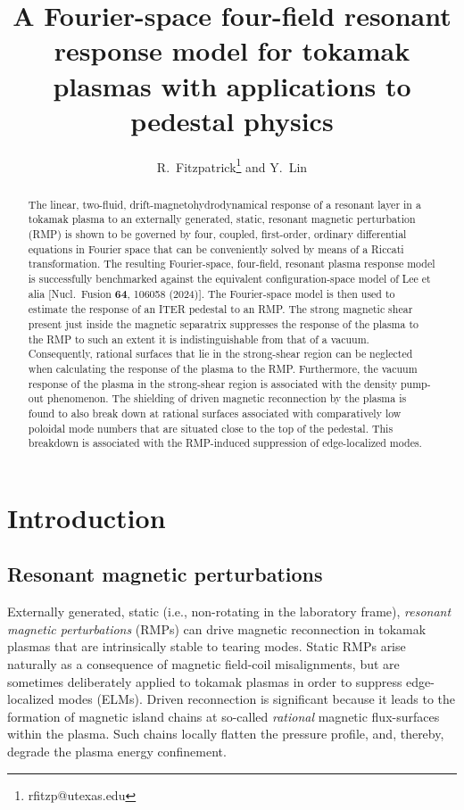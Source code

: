 \documentclass[12pt,prb,aps]{revtex4-1}
\begin{document}
\title{A Fourier-space four-field resonant response model for tokamak plasmas with applications to pedestal physics}

\author{R.~Fitzpatrick\footnote{rfitzp@utexas.edu} and Y.~Lin}

\begin{abstract}
The linear, two-fluid, drift-magnetohydrodynamical  response of a resonant layer in a tokamak plasma to an externally generated, static,  resonant magnetic
perturbation (RMP) is shown to be governed by four, coupled, first-order, ordinary differential equations in Fourier space 
that can be  conveniently solved by means of a Riccati transformation. The resulting Fourier-space, four-field, resonant plasma response model is 
successfully benchmarked against the equivalent configuration-space model of Lee et alia  [Nucl.\ Fusion {\bf 64}, 106058 (2024)].  The Fourier-space model is then used to
estimate the response of an ITER pedestal to an RMP.  The strong magnetic shear present just inside the magnetic
separatrix suppresses the response of the plasma to the RMP to such an extent it is indistinguishable from that
of a vacuum. Consequently, rational surfaces that lie in the strong-shear region can be neglected when calculating the response of the plasma to the RMP.  Furthermore, the vacuum response of the plasma in the strong-shear region is associated with the density pump-out phenomenon. The shielding of driven magnetic reconnection  by the plasma is found to also break down at rational surfaces associated with comparatively low
poloidal mode numbers that are situated close to the top of the pedestal. This breakdown is associated with the RMP-induced suppression of edge-localized modes.  

\end{abstract}

\maketitle

\section{Introduction}
\subsection{Resonant magnetic perturbations}
Externally generated, static (i.e., non-rotating in the laboratory frame), {\em resonant magnetic perturbations}\/ (RMPs) can drive magnetic reconnection in tokamak plasmas that
are intrinsically stable to tearing modes. \cite{sco,compass,fish,rf1993,rf1998} Static RMPs arise naturally as a consequence  of magnetic
field-coil misalignments,\cite{error} but are sometimes deliberately applied to tokamak plasmas in order to suppress edge-localized modes (ELMs).\cite{elmx}
Driven reconnection is significant because it leads to the formation of magnetic island chains at so-called {\em rational}\/ magnetic flux-surfaces within the plasma. \cite{boz} Such chains locally flatten the pressure profile, and, thereby, degrade the plasma energy confinement.\cite{chang}
\end{document}
